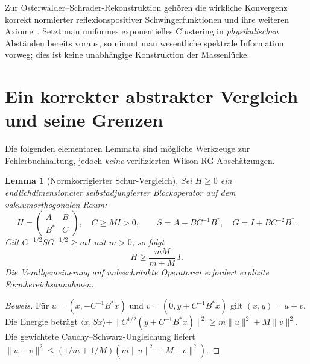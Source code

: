 \documentclass[11pt,a4paper]{article}
\newtheorem{lemma}[theorem]{Lemma}
\theoremstyle{remark}
\begin{document}
Zur Osterwalder--Schrader-Rekonstruktion
gehören die wirkliche Konvergenz korrekt
normierter reflexionspositiver
Schwingerfunktionen und ihre weiteren
Axiome~\cite{OS1,OS2}.
Setzt man uniformes exponentielles
Clustering in \emph{physikalischen}
Abständen bereits voraus, so nimmt man
wesentliche spektrale Information vorweg;
dies ist keine unabhängige Konstruktion
der Massenlücke.

\section{Ein korrekter abstrakter Vergleich und seine Grenzen}
Die folgenden elementaren Lemmata
sind mögliche Werkzeuge zur
Fehlerbuchhaltung, jedoch
\emph{keine} verifizierten
Wilson-RG-Abschätzungen.

\begin{lemma}[Normkorrigierter Schur-Vergleich]\label{lem:schur}
Sei $H\ge0$ ein endlichdimensionaler
selbstadjungierter Blockoperator auf
dem vakuumorthogonalen Raum:
\[
H=\begin{pmatrix}A&B\\B^*&C\end{pmatrix},
\quad C\ge MI>0,\qquad
S=A-BC^{-1}B^*,\quad G=I+BC^{-2}B^*.
\]
Gilt $G^{-1/2}SG^{-1/2}\ge mI$
mit $m>0$, so folgt
\[
\boxed{\quad H\ge\frac{mM}{m+M}\,I.\quad}
\]
Die Verallgemeinerung auf unbeschränkte
Operatoren erfordert explizite
Formbereichsannahmen.
\end{lemma}
\begin{proof}[Beweis]
Für $u=(x,-C^{-1}B^*x)$ und
$v=(0,y+C^{-1}B^*x)$ gilt
$(x,y)=u+v$.
Die Energie beträgt
$\langle x,Sx\rangle+
\|C^{1/2}(y+C^{-1}B^*x)\|^2
\ge m\|u\|^2+M\|v\|^2$.
Die gewichtete Cauchy--Schwarz-Ungleichung
liefert
$\|u+v\|^2\le(1/m+1/M)
(m\|u\|^2+M\|v\|^2)$.
\end{proof}
\end{document}

